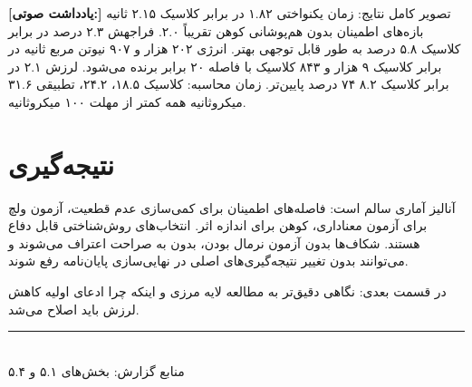 \documentclass[12pt, a4paper]{article}
\newcommand{\dash}{\lr{---}}
\begin{document}
\begin{mdframed}[
  backgroundcolor=audiotan,
  linecolor=audionote!70,
  linewidth=1pt,
  innerleftmargin=12pt,
  innerrightmargin=12pt,
  innertopmargin=8pt,
  innerbottommargin=8pt
]
\textbf{\color{audionote}[يادداشت صوتی:]}
تصوير کامل نتايج: زمان يکنواختی  ۱.۸۲ در برابر کلاسيک ۲.۱۵ ثانيه \dash{} بازه‌های اطمينان بدون هم‌پوشانی \dash{}  کوهن تقريباً ۲.۰. فراجهش  ۲.۳ درصد در برابر کلاسيک ۵.۸ درصد \dash{}  به طور قابل توجهی بهتر. انرژی  ۲۰۲ هزار و ۹۰۷ نيوتن مربع ثانيه در برابر کلاسيک ۹ هزار و ۸۴۳ \dash{} کلاسيک با فاصله ۲۰ برابر برنده می‌شود. لرزش  ۲.۱ در برابر کلاسيک ۸.۲ \dash{}  ۷۴ درصد پايين‌تر. زمان محاسبه: کلاسيک ۱۸.۵،  ۲۴.۲، تطبيقی ۳۱.۶ ميکروثانيه \dash{} همه کمتر از مهلت ۱۰۰ ميکروثانيه.
\end{mdframed}

\vspace{0.6cm}

\section{نتيجه‌گيری}

آناليز آماری سالم است: فاصله‌های اطمينان  برای کمی‌سازی عدم قطعيت، آزمون  ولچ برای آزمون معناداری،  کوهن برای اندازه اثر. انتخاب‌های روش‌شناختی قابل دفاع هستند. شکاف‌ها \dash{} بدون آزمون نرمال بودن، بدون  \dash{} به صراحت اعتراف می‌شوند و می‌توانند بدون تغيير نتيجه‌گيری‌های اصلی در نهايی‌سازی پايان‌نامه رفع شوند.

در قسمت بعدی: نگاهی دقيق‌تر به مطالعه لايه مرزی و اينکه چرا ادعای اوليه کاهش لرزش بايد اصلاح می‌شد.

\vspace{1.5cm}
\begin{center}
{\color{seriesblue}\rule{0.45\linewidth}{0.4pt}}\\[8pt]
{\small\color{sectiongray}
منابع گزارش: بخش‌های ۵.۱ و ۵.۴
}
\end{center}
\end{document}
